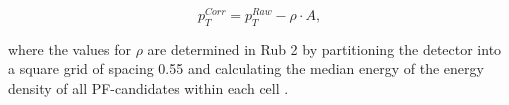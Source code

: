 \begin{equation}
p_T^{Corr} = p_T^{Raw} - \rho \cdot A,
\end{equation}

where the values for $\rho$ are determined in Rub 2 by partitioning the detector into a square grid of spacing
0.55 and calculating the median energy of the energy density of all PF-candidates within each cell \cite{fastjet}.




